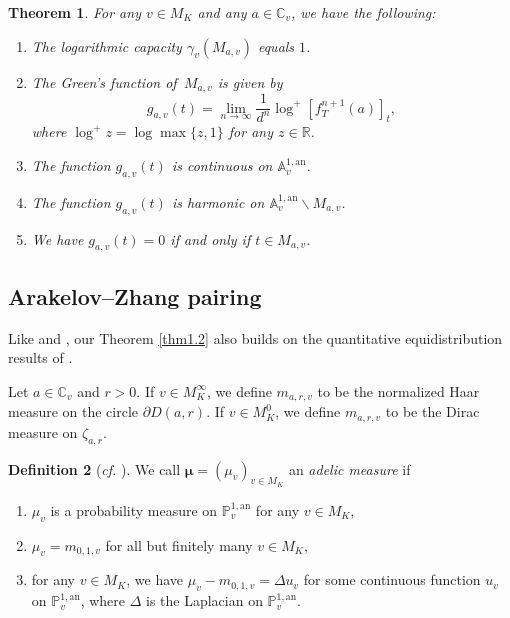 \documentclass[11pt]{amsart}
\numberwithin{equation}{section}
\theoremstyle{plain}
\newtheorem{thm}{Theorem}[section]
\theoremstyle{definition}
\newtheorem{defn}[thm]{Definition}
\theoremstyle{remark}
\newcommand{\A}{\mathbb A}
\newcommand{\C}{\mathbb C}
\newcommand{\PP}{\mathbb P}
\newcommand{\R}{\mathbb R}
\newcommand{\an}{\mathrm{an}}
\begin{document}
\begin{thm}
\label{thm2.1}For any $v\in M_{K}$ and any $a\in\C_{v}$,
we have the following:
\begin{enumerate}
\item The logarithmic capacity $\gamma_{v}(M_{a,v})$ equals $1$.
\item The Green's function of\, $M_{a,v}$ is given by
\[
g_{a,v}(t)=\lim_{n\to\infty}\frac{1}{d^{n}}\log^{+}\left[f_{T}^{n+1}(a)\right]_{t},
\]
where $\log^{+}z=\log\max\{z,1\}$ for any $z\in\R$.
\item The function $g_{a,v}(t)$ is continuous on $\A_{v}^{1,\an}$.
\item The function $g_{a,v}(t)$ is harmonic on $\A_{v}^{1,\an}\backslash M_{a,v}$.
\item We have  $g_{a,v}(t)=0$ if and only if $t\in M_{a,v}$.
\end{enumerate}
\end{thm}


\subsection{Arakelov--Zhang pairing}\label{sec2.4}

Like \cite[Theorem 1.7]{DKY1} and \cite[Theorem 1.9]{DKY2}, our Theorem
\ref{thm1.2} also builds on the quantitative equidistribution results
of \cite{FRL,Fi}.

Let $a\in\C_{v}$ and $r>0$. If $v\in M_{K}^{\infty}$, we
define $m_{a,r,v}$ to be the normalized Haar measure on the circle
$\partial D(a,r)$. If $v\in M_{K}^{0}$, we define $m_{a,r,v}$ to
be the Dirac measure on $\zeta_{a,r}$.

\begin{defn}[\textit{cf.} {\cite[D\'efinition 1.1]{FRL}}]\label{def2.2}
We call $\boldsymbol{\mu}=(\mu_{v})_{v\in M_{K}}$
an \textit{adelic measure} if
\begin{enumerate}
\item $\mu_{v}$ is a probability measure on $\PP_{v}^{1,\an}$
for any $v\in M_{K}$,
\item $\mu_{v}=m_{0,1,v}$ for all but finitely many $v\in M_{K}$,
\item for any $v\in M_{K}$, we have $\mu_{v}-m_{0,1,v}=\Delta u_{v}$ for some
continuous function $u_{v}$ on $\PP_{v}^{1,\an}$, where
$\Delta$ is the Laplacian on $\PP_{v}^{1,\an}$.
\end{enumerate}
\end{defn}
\end{document}
